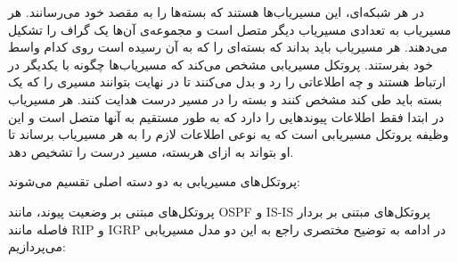 
در هر شبکه‌ای، این مسیریاب‌ها هستند که بسته‌ها را به مقصد خود می‌رسانند. هر مسیریاب به تعدادی مسیریاب دیگر متصل است و مجموعه‌ی آن‌ها یک گراف را تشکیل می‌دهند. هر مسیریاب باید بداند که بسته‌ای را که به آن رسیده است روی کدام واسط خود بفرستند. 
پروتکل مسیریابی مشخص می‌کند که مسیریاب‌ها چگونه با یکدیگر در ارتباط‌‌ هستند و چه اطلاعاتی را رد و بدل می‌کنند تا در نهایت بتوانند مسیری را که یک بسته باید طی کند مشخص کنند و بسته را در مسیر درست هدایت کنند. هر مسیریاب در ابتدا فقط اطلاعات پیوندهایی را دارد که به طور مستقیم به آنها متصل است و این وظیفه پروتکل مسیریابی است که یه نوعی اطلاعات لازم را به هر مسیریاب برساند تا او بتواند به ازای هربسته، مسیر درست را تشخیص دهد. 

پروتکل‌های مسیریابی به دو دسته اصلی تقسیم می‌شوند:‌

 پروتکل‌های مبتنی بر وضعیت پیوند، مانند OSPF
و
 IS-IS
 پروتکل‌های مبتنی بر بردار فاصله مانند RIP
و IGRP
 در ادامه به توضیح مختصری راجع به این دو مدل مسیریابی می‌پردازیم:
 

